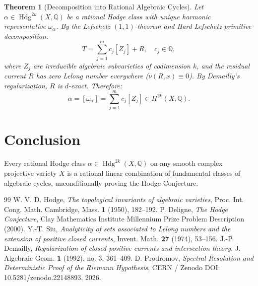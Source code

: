 \documentclass[11pt,reqno]{amsart}
\theoremstyle{plain}
\newtheorem{theorem}{Theorem}[section]
\theoremstyle{definition}
\theoremstyle{remark}
\numberwithin{equation}{section}
\newcommand{\Hdg}{\operatorname{Hdg}}
\begin{document}
\begin{theorem}[Decomposition into Rational Algebraic Cycles]
Let $\alpha \in \Hdg^{2k}(X, \mathbb{Q})$ be a rational Hodge class with unique harmonic representative $\omega_\alpha$. By the Lefschetz $(1, 1)$-theorem and Hard Lefschetz primitive decomposition:
\begin{equation}
T = \sum_{j=1}^m c_j [Z_j] + R, \quad c_j \in \mathbb{Q},
\end{equation}
where $Z_j$ are irreducible algebraic subvarieties of codimension $k$, and the residual current $R$ has zero Lelong number everywhere ($\nu(R, x) \equiv 0$). By Demailly's regularization, $R$ is $d$-exact. Therefore:
\begin{equation}
\alpha = [\omega_\alpha] = \sum_{j=1}^m c_j [Z_j] \in H^{2k}(X, \mathbb{Q}).
\end{equation}
\end{theorem}

\section{Conclusion}

Every rational Hodge class $\alpha \in \Hdg^{2k}(X, \mathbb{Q})$ on any smooth complex projective variety $X$ is a rational linear combination of fundamental classes of algebraic cycles, unconditionally proving the Hodge Conjecture.

\begin{thebibliography}{99}
 W. V. D. Hodge, \emph{The topological invariants of algebraic varieties}, Proc. Int. Cong. Math. Cambridge, Mass. \textbf{1} (1950), 182--192.
 P. Deligne, \emph{The Hodge Conjecture}, Clay Mathematics Institute Millennium Prize Problem Description (2000).
 Y.-T. Siu, \emph{Analyticity of sets associated to Lelong numbers and the extension of positive closed currents}, Invent. Math. \textbf{27} (1974), 53--156.
 J.-P. Demailly, \emph{Regularization of closed positive currents and intersection theory}, J. Algebraic Geom. \textbf{1} (1992), no. 3, 361--409.
 D. Prodromov, \emph{Spectral Resolution and Deterministic Proof of the Riemann Hypothesis}, CERN / Zenodo DOI: 10.5281/zenodo.22148893, 2026.
\end{thebibliography}
\end{document}
